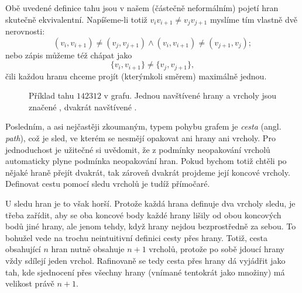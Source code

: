 \begin{warning}
 Obě uvedené definice tahu jsou v našem (částečně neformálním) pojetí hran
 skutečně ekvivalentní. Napíšeme-li totiž $v_i v_{i+1} \neq v_j v_{j+1}$ myslíme
 tím vlastně dvě nerovnosti:
 \[
  (v_i,v_{i+1}) \neq (v_j,v_{j+1}) \wedge (v_i,v_{i+1}) \neq (v_{j+1},v_j);
 \]
 nebo zápis můžeme též chápat jako
 \[
  \{v_i,v_{i+1}\} \neq \{v_j,v_{j+1}\},
 \]
 čili každou hranu chceme projít (kterýmkoli směrem) maximálně jednou.
\end{warning}

\begin{figure}[h]
 \centering
 \caption{Příklad tahu $142312$ v grafu. Jednou navštívené hrany a vrcholy jsou
 značené , dvakrát navštívené .}
 \label{fig:priklad-sledu}
\end{figure}

Posledním, a asi nejčastěji zkoumaným, typem pohybu grafem je \emph{cesta}
(angl. \emph{path}), což je sled, ve kterém se nesmějí opakovat ani hrany ani
vrcholy. Pro jednoduchost je užitečné si uvědomit, že z podmínky neopakování
vrcholů automaticky plyne podmínka neopakování hran. Pokud bychom totiž chtěli
po nějaké hraně přejít dvakrát, tak zároveň dvakrát projdeme její koncové
vrcholy. Definovat cestu pomocí sledu vrcholů je tudíž přímočaré.

U sledu hran je to však horší. Protože každá hrana definuje dva vrcholy sledu,
je třeba zařídit, aby se oba koncové body každé hrany lišily od obou koncových
bodů jiné hrany, ale jenom tehdy, když hrany nejdou bezprostředně za sebou. To
bohužel vede na trochu neintuitivní definici cesty přes hrany. Totiž, cesta
obsahující $n$ hran nutně obsahuje $n+1$ vrcholů, protože po sobě jdoucí hrany
vždy sdílejí jeden vrchol. Rafinovaně se tedy cesta přes hrany dá vyjádřit jako
tah, kde sjednocení přes všechny hrany (vnímané tentokrát jako množiny) má
velikost právě $n + 1$.


